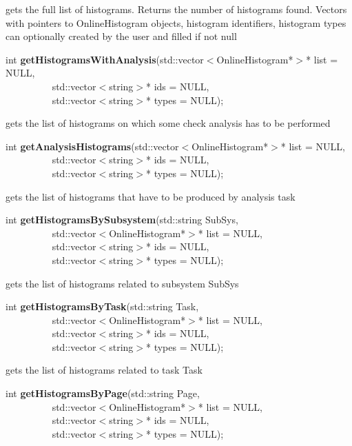  gets the full list of histograms. Returns the number of histograms found. Vectors with pointers
 to OnlineHistogram objects, histogram identifiers, histogram types can optionally created  by the user
 and filled if not null


\item    int {\bf getHistogramsWithAnalysis}(std::vector$<$OnlineHistogram*$>$* list = NULL,\\\mbox{}~~~~~~~~~
				std::vector$<$string$>$* ids = NULL,\\\mbox{}~~~~~~~~~
				std::vector$<$string$>$* types = NULL);

 gets the list of histograms on which some check analysis has to be performed 


\item    int {\bf getAnalysisHistograms}(std::vector$<$OnlineHistogram*$>$* list = NULL,\\\mbox{}~~~~~~~~~
			    std::vector$<$string$>$* ids = NULL,\\\mbox{}~~~~~~~~~
			    std::vector$<$string$>$* types = NULL);

 gets the list of histograms that have to be produced by analysis task


\item    int {\bf getHistogramsBySubsystem}(std::string SubSys,\\\mbox{}~~~~~~~~~
			       std::vector$<$OnlineHistogram*$>$* list = NULL,\\\mbox{}~~~~~~~~~
			       std::vector$<$string$>$* ids = NULL,\\\mbox{}~~~~~~~~~
			       std::vector$<$string$>$* types = NULL);

 gets the list of histograms related to subsystem SubSys


\item    int {\bf getHistogramsByTask}(std::string Task,\\\mbox{}~~~~~~~~~
			  std::vector$<$OnlineHistogram*$>$* list = NULL,\\\mbox{}~~~~~~~~~
			  std::vector$<$string$>$* ids = NULL,\\\mbox{}~~~~~~~~~
			  std::vector$<$string$>$* types = NULL);

 gets the list of histograms related to task Task


\item    int {\bf getHistogramsByPage}(std::string Page,\\\mbox{}~~~~~~~~~
			  std::vector$<$OnlineHistogram*$>$* list = NULL,\\\mbox{}~~~~~~~~~
			  std::vector$<$string$>$* ids = NULL,\\\mbox{}~~~~~~~~~
			  std::vector$<$string$>$* types = NULL);

